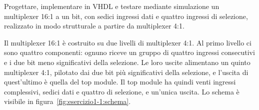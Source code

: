 \label{sec:esercizio1-1}

\begin{traccia}
Progettare, implementare in VHDL e testare mediante simulazione un multiplexer 16:1 a un bit, con sedici ingressi dati e quattro ingressi di selezione, realizzato in modo strutturale a partire da multiplexer 4:1.
\end{traccia}

\progetto

Il multiplexer 16:1 è costruito su due livelli di multiplexer 4:1. Al primo livello ci sono quattro componenti: ognuno riceve un gruppo di quattro ingressi consecutivi e i due bit meno significativi della selezione. Le loro uscite alimentano un quinto multiplexer 4:1, pilotato dai due bit più significativi della selezione, e l'uscita di quest'ultimo è quella del top module. Il top module ha quindi venti ingressi complessivi, sedici dati e quattro di selezione, e un'unica uscita. Lo schema è visibile in figura~\ref{fig:esercizio1-1:schema}.


